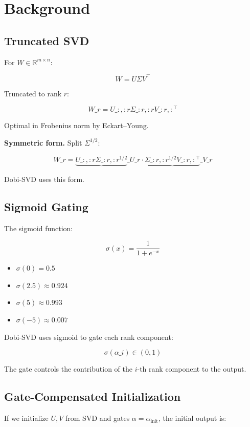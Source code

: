 
\section{Background}

\subsection{Truncated SVD}

For $W \in \mathbb{R}^{m \times n}$:

\[
W = U \Sigma V^\top
\tag{3.1}
\]

Truncated to rank $r$:

\[
W\_r = U\_{:, :r} \Sigma\_{:r, :r} V\_{:r, :}^\top
\tag{3.2}
\]

Optimal in Frobenius norm by Eckart--Young.

\textbf{Symmetric form.} Split $\Sigma^{1/2}$:

\[
W\_r = \underbrace{U\_{:, :r} \Sigma\_{:r, :r}^{1/2}}\_{U\_r} \cdot \underbrace{\Sigma\_{:r, :r}^{1/2} V\_{:r, :}^\top}\_{V\_r}
\tag{3.3}
\]

Dobi-SVD uses this form.

\subsection{Sigmoid Gating}

The sigmoid function:

\[
\sigma(x) = \frac{1}{1 + e^{-x}}
\tag{3.4}
\]

\begin{itemize}
\item $\sigma(0) = 0.5$
\item $\sigma(2.5) \approx 0.924$
\item $\sigma(5) \approx 0.993$
\item $\sigma(-5) \approx 0.007$

\end{itemize}
Dobi-SVD uses sigmoid to gate each rank component:

\[
\sigma(\alpha\_i) \in (0, 1)
\tag{3.5}
\]

The gate controls the contribution of the $i$-th rank component to the 
output.

\subsection{Gate-Compensated Initialization}

If we initialize $U, V$ from SVD and gates $\alpha = \alpha_\text{init}$, 
the initial output is:

